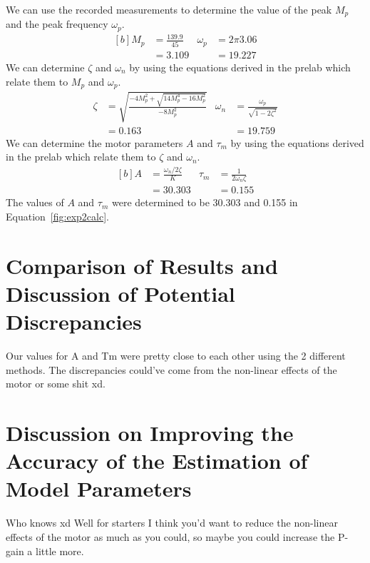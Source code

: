 \documentclass[12pt]{article}
\begin{document}
We can use the recorded measurements to determine the value of the peak $M_p$ and the peak frequency $\omega_p$.
\begin{equation*}
\begin{aligned}[b]
    M_p &= \frac{139.9}{45} & \omega_p &= 2\pi3.06 \\
    &= 3.109 & &= 19.227
\end{aligned}
\end{equation*}
We can determine $\zeta$ and $\omega_n$ by using the equations derived in the prelab which relate them to $M_p$ and $\omega_p$.
\begin{equation*}
\begin{aligned}
    \zeta &= \sqrt{\frac{-4M_p^2 + \sqrt{14M_p^4 - 16M_p^2}}{-8M_p^2}} & \omega_n &= \frac{\omega_p}{\sqrt{1-2\zeta^2}} \\
    &= 0.163 & &= 19.759
\end{aligned}
\end{equation*}
We can determine the motor parameters $A$ and $\tau_m$ by using the equations derived in the prelab which relate them to $\zeta$ and $\omega_n$.
\begin{equation} \label{fig:exp2calc}
\begin{aligned}[b]
    A &= \frac{\omega_n / 2\zeta}{K} & \tau_m &= \frac{1}{2\omega_n\zeta} \\
    &= 30.303 & &= 0.155
\end{aligned}
\end{equation}
The values of $A$ and $\tau_m$ were determined to be 30.303 and 0.155 in Equation~\ref{fig:exp2calc}.

\clearpage
\section*{Comparison of Results and Discussion of Potential Discrepancies}
Our values for A and Tm were pretty close to each other using the 2 different methods. The discrepancies could've come from the non-linear effects of the motor or some shit xd.

\section*{Discussion on Improving the Accuracy of the Estimation of Model Parameters}
Who knows xd
Well for starters I think you'd want to reduce the non-linear effects of the motor as much as you could, so maybe you could increase the P-gain a little more.
\end{document}
